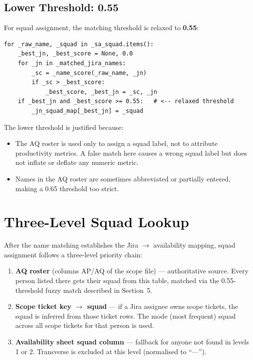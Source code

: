 \documentclass[12pt, a4paper]{article}
\begin{document}
\subsection{Lower Threshold: 0.55}

For squad assignment, the matching threshold is relaxed to \textbf{0.55}:

\begin{lstlisting}[style=python, caption={AQ roster to Jira name matching (threshold 0.55)}]
for _raw_name, _squad in _sa_squad.items():
    _best_jn, _best_score = None, 0.0
    for _jn in _matched_jira_names:
        _sc = _name_score(_raw_name, _jn)
        if _sc > _best_score:
            _best_score, _best_jn = _sc, _jn
    if _best_jn and _best_score >= 0.55:   # <-- relaxed threshold
        _jn_squad_map[_best_jn] = _squad
\end{lstlisting}

\noindent
The lower threshold is justified because:

\begin{itemize}
    \item The AQ roster is used only to assign a squad label, not to attribute productivity
          metrics. A false match here causes a wrong squad label but does not inflate or
          deflate any numeric metric.
    \item Names in the AQ roster are sometimes abbreviated or partially entered, making
          a 0.65 threshold too strict.
\end{itemize}

\section{Three-Level Squad Lookup}

After the name matching establishes the Jira $\to$ availability mapping, squad assignment
follows a three-level priority chain:

\begin{enumerate}
    \item \textbf{AQ roster} (columns AP/AQ of the scope file) — authoritative source.
          Every person listed there gets their squad from this table, matched via the
          0.55-threshold fuzzy match described in Section~5.

    \item \textbf{Scope ticket key $\to$ squad} — if a Jira assignee owns scope tickets,
          the squad is inferred from those ticket rows. The mode (most frequent) squad
          across all scope tickets for that person is used.

    \item \textbf{Availability sheet squad column} — fallback for anyone not found in
          levels 1 or 2. Transverse is excluded at this level (normalised to ``—'').
\end{enumerate}
\end{document}
